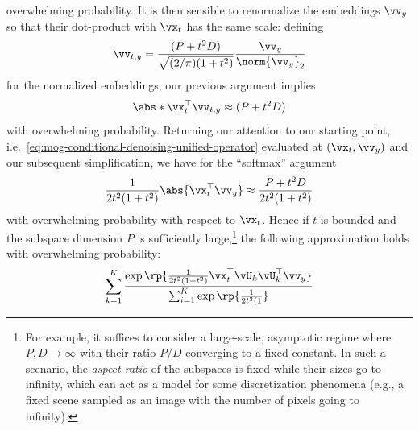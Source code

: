 \documentclass[../../book-main.tex]{subfiles}
\begin{document}
\begin{example}
    overwhelming probability.
    It is then sensible to renormalize the embeddings $\vv_y$ so that their
    dot-product with $\vx_t$ has the same scale: defining
    \begin{equation*}
        \vv_{t, y} = \frac{(P + t^2 D)}{\sqrt{(2/\pi)(1 + t^2)}}
        \frac{\vv_y}{\norm{\vv_y}_2}
    \end{equation*}
    for the normalized embeddings, our previous argument implies
    \begin{equation*}
        \abs*{\vx_t^\top \vv_{t,y}}
        \approx
        (P + t^2 D)
    \end{equation*}
    with overwhelming probability.
    Returning our attention to our starting point, i.e.\
    \eqref{eq:mog-conditional-denoising-unified-operator} evaluated at $(\vx_t,
    \vv_y)$ and our subsequent
    simplification, we have for the ``softmax'' argument
    \begin{equation*}
        {\frac{1}{2t^{2}(1 + t^{2})}\abs{\vx_t^\top \vv_y}}
        \approx
        \frac{P + t^2 D}{2t^{2}(1 + t^{2})}
    \end{equation*}
    with overwhelming probability with respect to $\vx_t$.
    Hence if $t$ is bounded and the subspace dimension $P$ is sufficiently
    large,\footnote{For example, it suffices to consider a large-scale,
        asymptotic regime where $P, D \to \infty$ with their ratio
        $P/D$ converging
        to a fixed constant. In such a scenario, the \textit{aspect
        ratio} of the
        subspaces is fixed while their sizes go to infinity, which can act as
        a model for some discretization phenomena (e.g., a fixed
            scene sampled as an
    image with the number of pixels going to infinity).}
    the following approximation holds with overwhelming probability:
    \begin{equation}
        \sum_{k = 1}^{K}
        \frac{
            \exp\rp{\frac{1}{2t^{2}(1
            + t^{2})}\vx_t^\top \vU_k \vU_k^\top \vv_y}
        }
        {
            \sum_{i
            = 1}^{K}\exp\rp{\frac{1}{2t^{2}(1
}}}
\end{equation}
\end{example}
\end{document}
